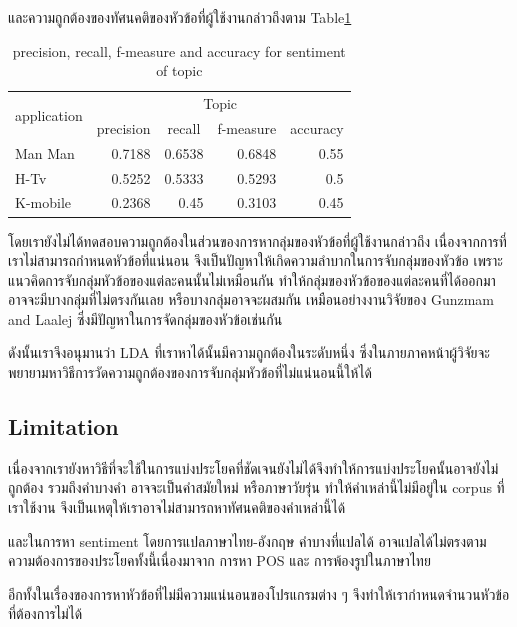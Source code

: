 และความถูกต้องของทัศนคติของหัวข้อที่ผู้ใช้งานกล่าวถึงตาม Table\ref{table:f-measureTopic}
\begin{table}
	\caption{precision, recall, f-measure and accuracy for sentiment of topic}
	\label{table:f-measureTopic}
	\centering
	\begin{tabular}{|l|r|r|r|r|}
		\hline
		\multicolumn{1}{|c|}{\multirow{2}{*}{application}} & 
		\multicolumn{4}{|c|}{Topic} \\
		\cline{2-5}
		\multicolumn{1}{|c|}{} &
		\multicolumn{1}{|c|}{precision}&
		\multicolumn{1}{|c|}{recall}&
		\multicolumn{1}{|c|}{f-measure} &
		\multicolumn{1}{|c|}{accuracy} \\
		\hline
		Man Man & 0.7188 & 0.6538 & 0.6848 & 0.55\\
		\hline
		H-Tv & 0.5252 & 0.5333 & 0.5293 & 0.5\\
		\hline
		K-mobile & 0.2368 & 0.45 & 0.3103 & 0.45\\
		\hline
	\end{tabular}
\end{table}

โดยเรายังไม่ได้ทดสอบความถูกต้องในส่วนของการหากลุ่มของหัวข้อที่ผู้ใช้งานกล่าวถึง เนื่องจากการที่เราไม่สามารถกำหนดหัวข้อที่แน่นอน จึงเป็นปัญหาให้เกิดความลำบากในการจับกลุ่มของหัวข้อ เพราะแนวคิดการจับกลุ่มหัวข้อของแต่ละคนนั้นไม่เหมือนกัน ทำให้กลุ่มของหัวข้อของแต่ละคนที่ได้ออกมาอาจจะมีบางกลุ่มที่ไม่ตรงกันเลย หรือบางกลุ่มอาจจะผสมกัน เหมือนอย่างงานวิจัยของ Gunzmam and Laalej \cite{userslikefeature} ซึ่งมีปัญหาในการจัดกลุ่มของหัวข้อเช่นกัน

ดังนั้นเราจึงอนุมานว่า LDA ที่เราหาได้นั้นมีความถูกต้องในระดับหนึ่ง ซึ่งในภายภาคหน้าผู้วิจัยจะพยายามหาวิธีการวัดความถูกต้องของการจับกลุ่มหัวข้อที่ไม่แน่นอนนี้ให้ได้




\subsection*{Limitation}
เนื่องจากเรายังหาวิธีที่จะใช้ในการแบ่งประโยคที่ชัดเจนยังไม่ได้จึงทำให้การแบ่งประโยคนั้นอาจยังไม่ถูกต้อง รวมถึงคำบางคำ อาจจะเป็นคำสมัยใหม่ หรือภาษาวัยรุ่น ทำให้คำเหล่านี้ไม่มีอยู่ใน corpus ที่เราใช้งาน จึงเป็นเหตุให้เราอาจไม่สามารถหาทัศนคติของคำเหล่านี้ได้

และในการหา sentiment โดยการแปลภาษาไทย-อังกฤษ คำบางที่แปลได้ อาจแปลได้ไม่ตรงตามความต้องการของประโยคทั้งนี้เนื่องมาจาก การหา POS และ การพ้องรูปในภาษาไทย

อีกทั้งในเรื่องของการหาหัวข้อที่ไม่มีความแน่นอนของโปรแกรมต่าง ๆ จึงทำให้เรากำหนดจำนวนหัวข้อที่ต้องการไม่ได้



